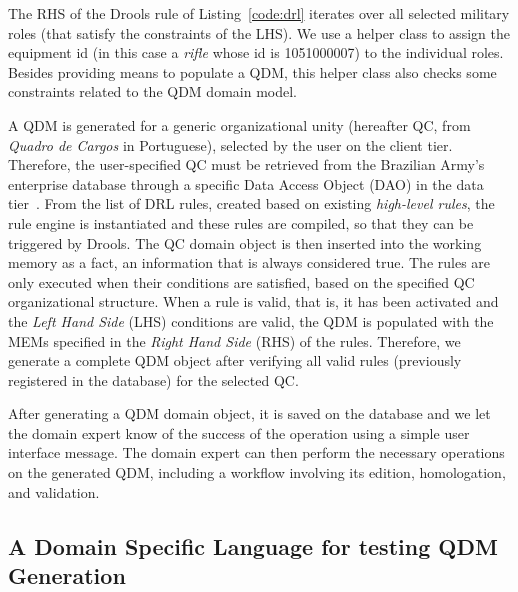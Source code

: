 \documentclass[twocolumn]{bmcart}%
\newcommand{\callers}{\emph{high-level rules}\xspace}
\begin{document}
The RHS of the Drools rule of Listing~\ref{code:drl} iterates over all selected military roles (that satisfy the constraints of the LHS). We use a helper class to assign the equipment id (in this case a \emph{rifle} whose id is 1051000007) to the individual roles. Besides providing means to populate a QDM, this helper class also checks some constraints related to the QDM domain model. 



A QDM is generated for a generic organizational unity (hereafter QC, from \emph{Quadro de Cargos} in Portuguese), selected by the user on the client tier. Therefore, the user-specified QC must be retrieved from the Brazilian Army's enterprise database through a specific Data Access Object (DAO) in the data tier~\cite{alur2003}. From the list of DRL rules, created based on existing \callers, the rule engine is instantiated and these rules are compiled, so that they can be triggered by Drools. The QC domain object is then inserted into the working memory as a fact, an information that is always considered true. The rules are only executed when their conditions are satisfied, based on the specified QC organizational structure. When a rule is valid, that is, it has been activated and the \emph{Left Hand Side} (LHS) conditions are valid, the QDM is populated with the MEMs specified in the \emph{Right Hand Side} (RHS) of the rules. Therefore, we generate a complete QDM object after verifying all valid rules (previously registered in the database) for the selected QC. 

After generating a QDM domain object, it is saved on the database and we let the domain expert know of the success of the operation using a simple user interface message. The domain expert can then perform the necessary operations on the generated QDM, including a workflow involving  its edition, homologation, and validation.  





\subsection{A Domain Specific Language for testing QDM Generation}
\end{document}
